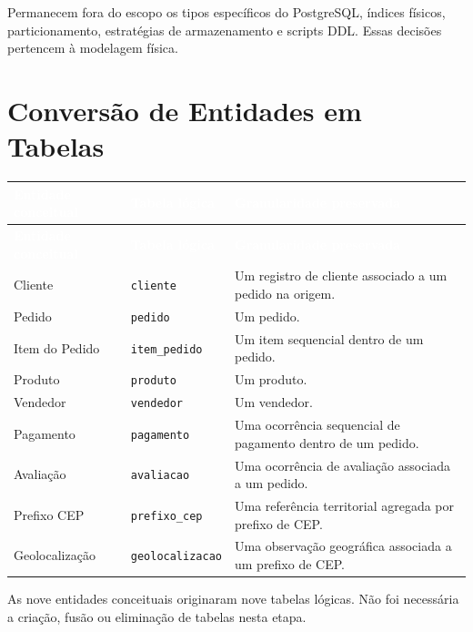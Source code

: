 \documentclass[12pt,a4paper]{article}
\begin{document}
	Permanecem fora do escopo os tipos específicos do PostgreSQL, índices físicos,
	particionamento, estratégias de armazenamento e scripts DDL. Essas decisões
	pertencem à modelagem física.

	\section{Conversão de Entidades em Tabelas}
	{\small
		\renewcommand{\arraystretch}{1.35}
		\begin{longtable}{|>{\raggedright\arraybackslash}p{3.2cm}|>{\raggedright\arraybackslash}p{3cm}|>{\raggedright\arraybackslash}p{8cm}|}
			\hline
			\rowcolor{AzulCorporativo}
			\textcolor{white}{\textbf{Entidade conceitual}} & \textcolor{white}{\textbf{Tabela lógica}} & \textcolor{white}{\textbf{Granularidade preservada}} \\ \hline
			\endfirsthead
			\hline
			\rowcolor{AzulCorporativo}
			\textcolor{white}{\textbf{Entidade conceitual}} & \textcolor{white}{\textbf{Tabela lógica}} & \textcolor{white}{\textbf{Granularidade preservada}} \\ \hline
			\endhead
			Cliente & \texttt{cliente} & Um registro de cliente associado a um pedido na origem. \\ \hline
			Pedido & \texttt{pedido} & Um pedido. \\ \hline
			Item do Pedido & \texttt{item\_pedido} & Um item sequencial dentro de um pedido. \\ \hline
			Produto & \texttt{produto} & Um produto. \\ \hline
			Vendedor & \texttt{vendedor} & Um vendedor. \\ \hline
			Pagamento & \texttt{pagamento} & Uma ocorrência sequencial de pagamento dentro de um pedido. \\ \hline
			Avaliação & \texttt{avaliacao} & Uma ocorrência de avaliação associada a um pedido. \\ \hline
			Prefixo CEP & \texttt{prefixo\_cep} & Uma referência territorial agregada por prefixo de CEP. \\ \hline
			Geolocalização & \texttt{geolocalizacao} & Uma observação geográfica associada a um prefixo de CEP. \\ \hline
	\end{longtable}}

	As nove entidades conceituais originaram nove tabelas lógicas. Não foi
	necessária a criação, fusão ou eliminação de tabelas nesta etapa.
\end{document}
